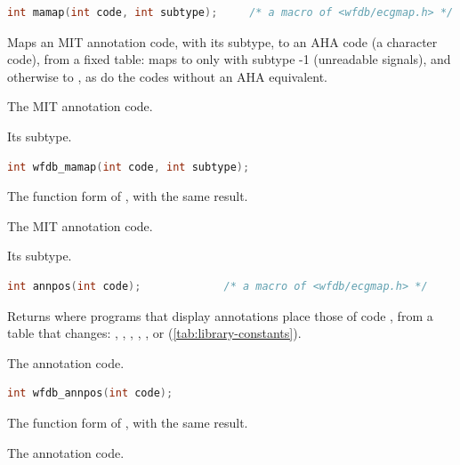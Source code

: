 \begin{lstlisting}[language=C,style=signature]
int mamap(int code, int subtype);     /* a macro of <wfdb/ecgmap.h> */
\end{lstlisting}
Maps an MIT annotation code, with its subtype, to an AHA code (a character
code), from a fixed table:  maps to  only with subtype
-1 (unreadable signals), and otherwise to , as do the codes without
an AHA equivalent.
\begin{params}
\item[code] The MIT annotation code.
\item[subtype] Its subtype.
\end{params}

\begin{lstlisting}[language=C,style=signature]
int wfdb_mamap(int code, int subtype);
\end{lstlisting}
The function form of , with the same result.
\begin{params}
\item[code] The MIT annotation code.
\item[subtype] Its subtype.
\end{params}

\begin{lstlisting}[language=C,style=signature]
int annpos(int code);             /* a macro of <wfdb/ecgmap.h> */
\end{lstlisting}
Returns where programs that display annotations place those of code
, from a table that  changes: ,
, , , ,  or
 (\cref{tab:library-constants}).
\begin{params}
\item[code] The annotation code.
\end{params}

\begin{lstlisting}[language=C,style=signature]
int wfdb_annpos(int code);
\end{lstlisting}
The function form of , with the same result.
\begin{params}
\item[code] The annotation code.
\end{params}

